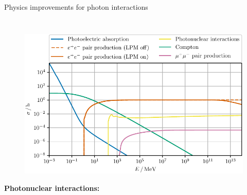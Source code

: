 \documentclass[t]{beamer}
\begin{document}
\begin{columns}[onlytextwidth]
\begin{column}{\textwidth}
\begin{block}{Physics improvements for photon interactions}
\begin{minipage}[t]{0.3\textwidth}
\begin{minipage}[t][10cm]{\textwidth}
\begin{columns}[onlytextwidth]
\begin{column}{0.35\textwidth}
\begin{figure}
\begin{tikzpicture}[>=stealth', pos=.35, photon/.style={decorate,decoration={snake,post length=2mm}}]
                    \end{tikzpicture}
                    \end{figure}
                \end{column}            
            \end{columns}
          \end{minipage}
        \end{minipage}
        \begin{minipage}[t]{0.4\textwidth}
          \begin{figure}
            \vspace{1cm}
            \includegraphics[width=0.9\linewidth, keepaspectratio]{../plots/Photon_Air_dndx_ecut_0.pdf}
          \end{figure}
        \end{minipage}
        \begin{minipage}[t]{0.3\textwidth}
          \begin{minipage}[t][11cm]{\textwidth}
             {\Large\textbf{Photonuclear interactions:}}
            \begin{columns}[onlytextwidth]
                \begin{column}{0.35\textwidth}%
                  \vspace{1.0cm}
                  \begin{figure}
                    \begin{tikzpicture}[>=stealth', pos=.55, photon/.style={decorate,decoration={snake,post length=2mm}}]


\end{tikzpicture}
\end{figure}
\end{column}
\end{columns}
\end{minipage}
\end{minipage}
\end{block}
\end{column}
\end{columns}
\end{document}
